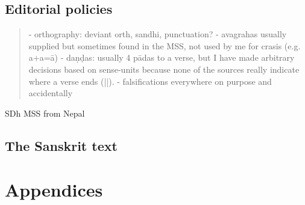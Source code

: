 \documentclass[11pt]{book}
\begin{document}
\section{Editorial policies}

\begin{quote}
- orthography: deviant orth, sandhi, punctuation?
- avagrahas usually supplied but sometimes found in the MSS, not used by me for crasis (e.g. a+a=ā)
- daṇḍas: usually 4 pādas to a verse, but I have made arbitrary decisions based on sense-units 
  because none of the sources really indicate where a verse ends (||).
- falsifications everywhere on purpose and accidentally
\end{quote}

SDh MSS from Nepal



\vfill
\pagebreak



\setcounter{page}{500}

\section{The Sanskrit text}










%

\setcounter{page}{1000}










\chapter*{Appendices}
\end{document}

